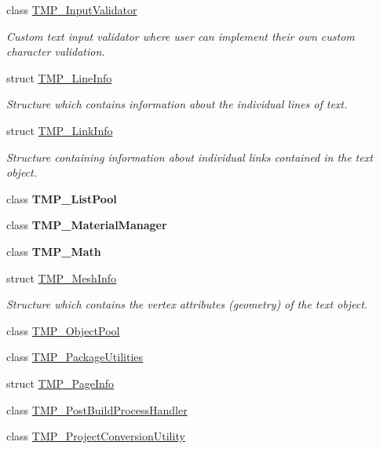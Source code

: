 \begin{DoxyCompactItemize}
class \mbox{\hyperlink{class_t_m_pro_1_1_t_m_p___input_validator}{T\+M\+P\+\_\+\+Input\+Validator}}
\begin{DoxyCompactList}\small\item\em Custom text input validator where user can implement their own custom character validation. \end{DoxyCompactList}\item 
struct \mbox{\hyperlink{struct_t_m_pro_1_1_t_m_p___line_info}{T\+M\+P\+\_\+\+Line\+Info}}
\begin{DoxyCompactList}\small\item\em Structure which contains information about the individual lines of text. \end{DoxyCompactList}\item 
struct \mbox{\hyperlink{struct_t_m_pro_1_1_t_m_p___link_info}{T\+M\+P\+\_\+\+Link\+Info}}
\begin{DoxyCompactList}\small\item\em Structure containing information about individual links contained in the text object. \end{DoxyCompactList}\item 
class {\bfseries T\+M\+P\+\_\+\+List\+Pool}
\item 
class {\bfseries T\+M\+P\+\_\+\+Material\+Manager}
\item 
class {\bfseries T\+M\+P\+\_\+\+Math}
\item 
struct \mbox{\hyperlink{struct_t_m_pro_1_1_t_m_p___mesh_info}{T\+M\+P\+\_\+\+Mesh\+Info}}
\begin{DoxyCompactList}\small\item\em Structure which contains the vertex attributes (geometry) of the text object. \end{DoxyCompactList}\item 
class \mbox{\hyperlink{class_t_m_pro_1_1_t_m_p___object_pool}{T\+M\+P\+\_\+\+Object\+Pool}}
\item 
class \mbox{\hyperlink{class_t_m_pro_1_1_t_m_p___package_utilities}{T\+M\+P\+\_\+\+Package\+Utilities}}
\item 
struct \mbox{\hyperlink{struct_t_m_pro_1_1_t_m_p___page_info}{T\+M\+P\+\_\+\+Page\+Info}}
\item 
class \mbox{\hyperlink{class_t_m_pro_1_1_t_m_p___post_build_process_handler}{T\+M\+P\+\_\+\+Post\+Build\+Process\+Handler}}
\item 
class \mbox{\hyperlink{class_t_m_pro_1_1_t_m_p___project_conversion_utility}{T\+M\+P\+\_\+\+Project\+Conversion\+Utility}}
\item 

\end{DoxyCompactItemize}
